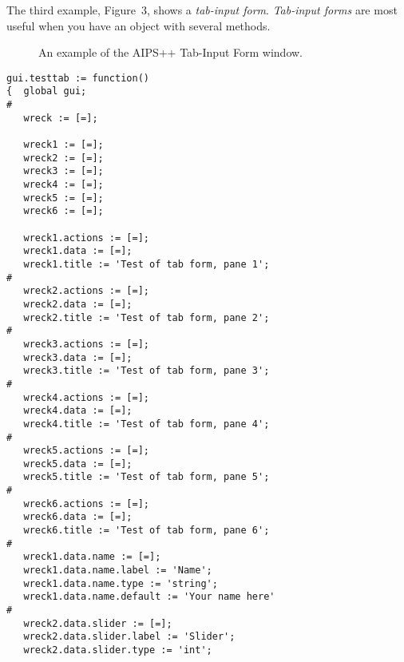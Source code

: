 The third example, Figure~3, shows a \textit{tab-input form}.  \textit{Tab-input forms} 
are most useful when you have an object with several methods.
\begin{figure}[here]
\caption{An example of the AIPS++ Tab-Input Form window.}
\end{figure}
\begin{verbatim}
gui.testtab := function()
{  global gui;
#
   wreck := [=];
 
   wreck1 := [=];
   wreck2 := [=];
   wreck3 := [=];
   wreck4 := [=];
   wreck5 := [=];
   wreck6 := [=];
 
   wreck1.actions := [=];  
   wreck1.data := [=];  
   wreck1.title := 'Test of tab form, pane 1';
#
   wreck2.actions := [=];  
   wreck2.data := [=];  
   wreck2.title := 'Test of tab form, pane 2';
#
   wreck3.actions := [=];  
   wreck3.data := [=];  
   wreck3.title := 'Test of tab form, pane 3';
#
   wreck4.actions := [=];  
   wreck4.data := [=];  
   wreck4.title := 'Test of tab form, pane 4';
#
   wreck5.actions := [=];  
   wreck5.data := [=];  
   wreck5.title := 'Test of tab form, pane 5';
#
   wreck6.actions := [=];  
   wreck6.data := [=];  
   wreck6.title := 'Test of tab form, pane 6';
#
   wreck1.data.name := [=];
   wreck1.data.name.label := 'Name';
   wreck1.data.name.type := 'string';
   wreck1.data.name.default := 'Your name here'
#
   wreck2.data.slider := [=];
   wreck2.data.slider.label := 'Slider';
   wreck2.data.slider.type := 'int';
 

\end{verbatim}
